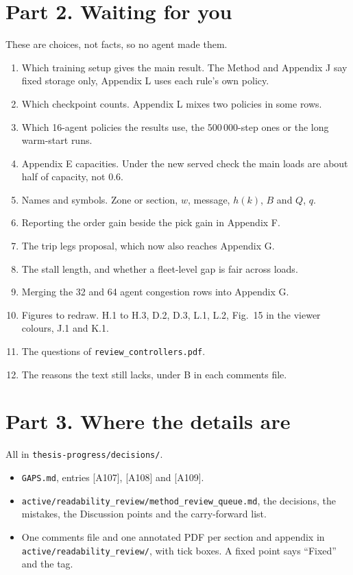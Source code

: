 \documentclass[11pt,a4paper]{article}
\begin{document}
\section*{Part 2. Waiting for you}
These are choices, not facts, so no agent made them.
\begin{enumerate}
  \item Which training setup gives the main result. The Method and Appendix J
        say fixed storage only, Appendix L uses each rule's own policy.
  \item Which checkpoint counts. Appendix L mixes two policies in some rows.
  \item Which 16-agent policies the results use, the 500\,000-step ones or
        the long warm-start runs.
  \item Appendix E capacities. Under the new served check the main loads are
        about half of capacity, not 0.6.
  \item Names and symbols. Zone or section, $w$, message, $h(k)$, $B$ and $Q$,
        $q$.
  \item Reporting the order gain beside the pick gain in Appendix F.
  \item The trip legs proposal, which now also reaches Appendix G.
  \item The stall length, and whether a fleet-level gap is fair across loads.
  \item Merging the 32 and 64 agent congestion rows into Appendix G.
  \item Figures to redraw. H.1 to H.3, D.2, D.3, L.1, L.2, Fig.~15 in the
        viewer colours, J.1 and K.1.
  \item The questions of \texttt{review\_controllers.pdf}.
  \item The reasons the text still lacks, under B in each comments file.
\end{enumerate}

\section*{Part 3. Where the details are}
All in \texttt{thesis-progress/decisions/}.
\begin{itemize}
  \item \texttt{GAPS.md}, entries [A107], [A108] and [A109].
  \item \texttt{active/readability\_review/method\_review\_queue.md}, the
        decisions, the mistakes, the Discussion points and the carry-forward
        list.
  \item One comments file and one annotated PDF per section and appendix in
        \texttt{active/readability\_review/}, with tick boxes. A fixed point
        says ``Fixed'' and the tag.
\end{itemize}
\end{document}
